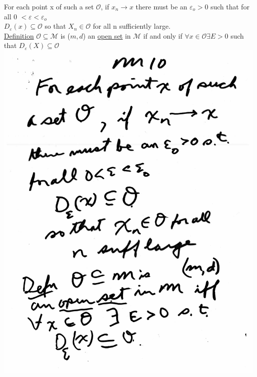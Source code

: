 \documentclass[10pt,a4paper]{article}
\begin{document}
{{\begin{flushleft}
For each point x of such a set $\mathcal{O}$, if $x_n \rightarrow x$ there must be an $\varepsilon_o > 0$ such that for all 0 $< \varepsilon < \varepsilon_o$ \\ $D_{\varepsilon}(x)\subseteq \mathcal{O}$ so that $X_n \in \mathcal{O}$ for all n sufficiently large.\\ \underline{Definition} $\mathcal{O}\subseteq \mathcal{M}$ is ($m,d$) an \underline{open set} in $\mathcal{M}$ if and only if $\forall x \in \mathcal{O } \exists E > 0$ such that $D_\varepsilon(X) \subseteq \mathcal{O}$\\
\includegraphics[scale=.5]{Pages/MS_10}
\newpage


\end{flushleft}}}
\end{document}
